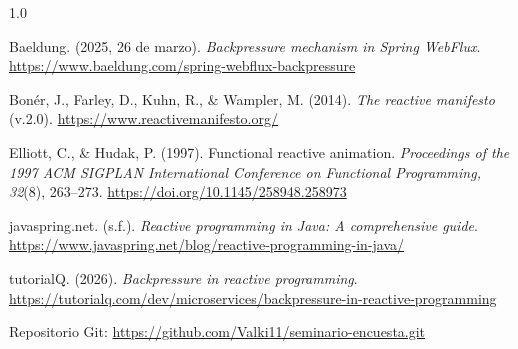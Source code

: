 \documentclass[12pt,letterpaper]{article}
\begin{document}
\begin{spacing}{1.0}
\setlength{\parindent}{-1.27cm}
\setlength{\leftskip}{1.27cm}

Baeldung. (2025, 26 de marzo). \textit{Backpressure mechanism in Spring WebFlux}. \url{https://www.baeldung.com/spring-webflux-backpressure}

Bonér, J., Farley, D., Kuhn, R., \& Wampler, M. (2014). \textit{The reactive manifesto} (v.2.0). \url{https://www.reactivemanifesto.org/}

Elliott, C., \& Hudak, P. (1997). Functional reactive animation. \textit{Proceedings of the 1997 ACM SIGPLAN International Conference on Functional Programming, 32}(8), 263--273. \url{https://doi.org/10.1145/258948.258973}

javaspring.net. (s.f.). \textit{Reactive programming in Java: A comprehensive guide}. \url{https://www.javaspring.net/blog/reactive-programming-in-java/}

tutorialQ. (2026). \textit{Backpressure in reactive programming}. \url{https://tutorialq.com/dev/microservices/backpressure-in-reactive-programming}

\end{spacing}

\vspace{12pt}
\noindent\small Repositorio Git: \url{https://github.com/Valki11/seminario-encuesta.git}
\end{document}
